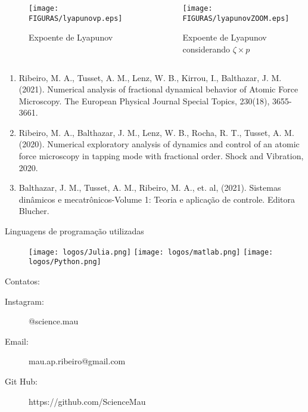 \documentclass[12pt,aspectratio=169]{beamer}
\begin{document}
\begin{frame}
\begin{columns}
\begin{figure}[h]
\centering
\texttt{[image: FIGURAS/lyapunovp.eps]}
\caption{Expoente de Lyapunov}
\end{figure}
\begin{figure}[h]
\centering
\texttt{[image: FIGURAS/lyapunovZOOM.eps]}
\caption{Expoente de Lyapunov considerando $\zeta \times p $}
\end{figure}
\end{columns}
\end{frame}

\begin{frame}{}
\begin{enumerate}
    \item Ribeiro, M. A., Tusset, A. M., Lenz, W. B., Kirrou, I., Balthazar, J. M. (2021). Numerical analysis of fractional dynamical behavior of Atomic Force Microscopy. The European Physical Journal Special Topics, 230(18), 3655-3661.
    \item Ribeiro, M. A., Balthazar, J. M., Lenz, W. B., Rocha, R. T., Tusset, A. M. (2020). Numerical exploratory analysis of dynamics and control of an atomic force microscopy in tapping mode with fractional order. Shock and Vibration, 2020.
    \item Balthazar, J. M., Tusset, A. M., Ribeiro, M. A., et. al, (2021). Sistemas dinâmicos e mecatrônicos-Volume 1: Teoria e aplicação de controle. Editora Blucher.
\end{enumerate}
\end{frame}

\begin{frame}{}
\begin{block}{Linguagens de programação utilizadas}
    \begin{figure}[h]
        \centering
        \texttt{[image: logos/Julia.png]}
        \texttt{[image: logos/matlab.png]}
        \texttt{[image: logos/Python.png]}
    \end{figure}
\end{block}

\begin{block}{Contatos:}
\begin{description}
\item[Instagram:] @science.mau
\item[Email:] mau.ap.ribeiro@gmail.com
\item[Git Hub:] https://github.com/ScienceMau

\end{description}
\end{block}
\end{frame}
\end{document}
